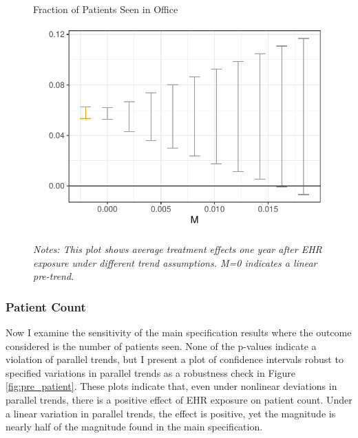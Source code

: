 \documentclass[12pt]{article}
\begin{document}
\begin{figure}[ht]
    \centering
    \captionsetup{width=.5\linewidth}
    \caption{Fraction of Patients Seen in Office}
    \includegraphics[scale=.5]{Objects/office_frac_pretrends_plot.pdf}
    \label{fig:pre_frac}
    \vspace{2mm}
    \caption*{\footnotesize{\textit{Notes: This plot shows average treatment effects one year after EHR exposure under different trend assumptions. M=0 indicates a linear pre-trend.}}}
\end{figure}

\subsubsection{Patient Count}

Now I examine the sensitivity of the main specification results where the outcome considered is the number of patients seen. None of the p-values indicate a violation of parallel trends, but I present a plot of confidence intervals robust to specified variations in parallel trends as a robustness check in Figure \ref{fig:pre_patient}. These plots indicate that, even under nonlinear deviations in parallel trends, there is a positive effect of EHR exposure on patient count. Under a linear variation in parallel trends, the effect is positive, yet the magnitude is nearly half of the magnitude found in the main specification. 
\end{document}
